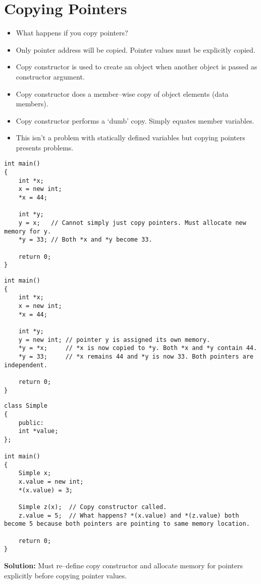 \documentclass[12pt,a4paper]{article}
\begin{document}
\section{Copying Pointers}
\begin{itemize}
\item What happens if you copy pointers?
\item Only pointer address will be copied. Pointer values must be explicitly copied.
\item Copy constructor is used to create an object when another object is passed as constructor argument.
\item Copy constructor does a member--wise copy of object elements (data members).
\item Copy constructor performs a `dumb' copy. Simply equates member variables.
\item This isn't a problem with statically defined variables but copying pointers presents problems.
\end{itemize}
\begin{lstlisting}[caption={Copying Pointers}]
int main()
{
	int *x;
	x = new int;
	*x = 44;
	
	int *y;
	y = x;   // Cannot simply just copy pointers. Must allocate new memory for y.
	*y = 33; // Both *x and *y become 33.
	
	return 0;
}

\end{lstlisting}
\begin{lstlisting}[caption={Proper Way to Copy Pointers}]
int main()
{
	int *x;
	x = new int;
	*x = 44;
	
	int *y;
	y = new int; // pointer y is assigned its own memory.
	*y = *x;     // *x is now copied to *y. Both *x and *y contain 44.
	*y = 33;     // *x remains 44 and *y is now 33. Both pointers are independent.
	
	return 0;
}

\end{lstlisting}
\begin{lstlisting}[caption={Copying Pointers Using Copy Constructor}]
class Simple
{
	public:
	int *value;
};

int main()
{
	Simple x;
	x.value = new int;
	*(x.value) = 3;
	
	Simple z(x);  // Copy constructor called.
	z.value = 5;  // What happens? *(x.value) and *(z.value) both become 5 because both pointers are pointing to same memory location.
	
	return 0;
}
\end{lstlisting}
\noindent\textbf{Solution:} Must re--define copy constructor and allocate memory for pointers explicitly before copying pointer values.


\end{document}

